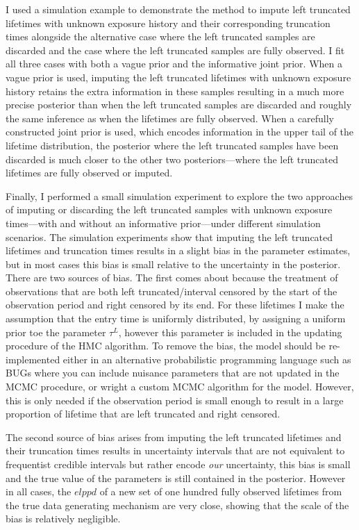 I used a simulation example to demonstrate the method to impute left truncated lifetimes with unknown exposure history and their corresponding truncation times alongside the alternative case where the left truncated samples are discarded and the case where the left truncated samples are fully observed. I fit all three cases with both a vague prior and the informative joint prior. When a vague prior is used, imputing the left truncated lifetimes with unknown exposure history retains the extra information in these samples resulting in a much more precise posterior than when the left truncated samples are discarded and roughly the same inference as when the lifetimes are fully observed. When a carefully constructed joint prior is used, which encodes information in the upper tail of the lifetime distribution, the posterior where the left truncated samples have been discarded is much closer to the other two posteriors---where the left truncated lifetimes are fully observed or imputed.

Finally, I performed a small simulation experiment to explore the two approaches of imputing or discarding the left truncated samples with unknown exposure times---with and without an informative prior---under different simulation scenarios. The simulation experiments show that imputing the left truncated lifetimes and truncation times results in a slight bias in the parameter estimates, but in most cases this bias is small relative to the uncertainty in the posterior. There are two sources of bias. The first comes about because
the treatment of observations that are both left truncated/interval censored by the start of the observation period and right censored by its end. For these lifetimes I make the assumption that the entry time is uniformly distributed, by assigning a uniform prior toe the parameter $\tau^L$, however this parameter is included in the updating procedure of the HMC algorithm. To remove the bias, the model should be re-implemented either in an alternative probabilistic programming language such as BUGs where you can include nuisance parameters that are not updated in the MCMC procedure, or wright a custom MCMC algorithm for the model. However, this is only needed if the observation period is small enough to result in a large proportion of lifetime that are left truncated and right censored.

The second source of bias arises from imputing the left truncated lifetimes and their truncation times results in uncertainty intervals that are not equivalent to frequentist credible intervals but rather encode \textit{our} uncertainty, this bias is small and the true value of the parameters is still contained in the posterior. However in all cases, the $elppd$ of a new set of one hundred fully observed lifetimes from the true data generating mechanism are very close, showing that the scale of the bias is relatively negligible.

